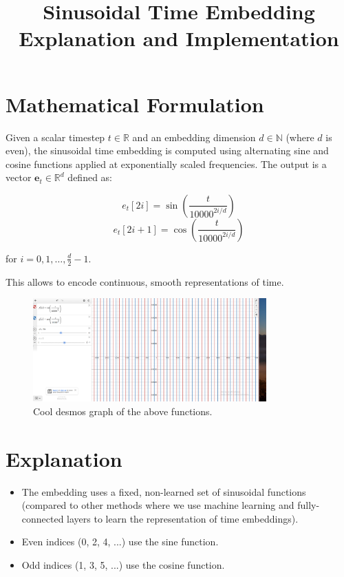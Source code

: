 \documentclass{article}
\title{Sinusoidal Time Embedding Explanation and Implementation}
\date{}
\begin{document}
\maketitle

\section{Mathematical Formulation}

Given a scalar timestep $t \in \mathbb{R}$ and an embedding dimension $d \in \mathbb{N}$ (where $d$ is even), the sinusoidal time embedding is computed using alternating sine and cosine functions applied at exponentially scaled frequencies. The output is a vector $\mathbf{e}_t \in \mathbb{R}^d$ defined as:


\[ e_t [2i] = \sin \left( \frac{t}{10000^{2i/d}} \right) \]
\[ e_t [2i+1] = \cos \left( \frac{t}{10000^{2i/d}} \right) \]

for $i = 0, 1, \dots, \frac{d}{2} - 1$.

This allows to encode continuous, smooth representations of time.


\begin{figure}[H]
    \centering
    \includegraphics[width=0.8\textwidth]{desmos.png}
    \caption{Cool desmos graph of the above functions.}
\end{figure}


\section{Explanation}

\begin{itemize}
    \item The embedding uses a fixed, non-learned set of sinusoidal functions (compared to other methods where we use machine learning and fully-connected layers to learn the representation of time embeddings).
    \item Even indices (0, 2, 4, ...) use the sine function.
    \item Odd indices (1, 3, 5, ...) use the cosine function.
\end{itemize}
\end{document}
